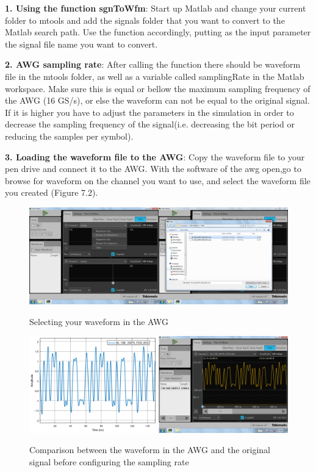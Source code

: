 \textbf{1. Using the function sgnToWfm}:
Start up Matlab and change your current folder to mtools and add the signals folder that you want to convert to the Matlab search path. Use the function accordingly, putting as the input parameter the signal file name you want to convert.
\bigskip

\noindent
\textbf{2. AWG sampling rate}:
After calling the function there should be waveform file in the mtools folder, as well as a variable called samplingRate in the Matlab workspace. Make sure this is equal or bellow the maximum sampling frequency of the AWG (16 GS/s), or else the waveform can not be equal to the original signal. If it is higher you  have to adjust the parameters in the simulation in order to decrease the sampling frequency of the signal(i.e. decreasing the bit period or reducing the samples per symbol).
\bigskip

\noindent
\textbf{3. Loading the waveform file to the AWG}:
Copy the waveform file to your pen drive and connect it to the AWG. With the software of the awg open,go to browse for waveform on the channel you want to use, and select the waveform file you created (Figure 7.2).

\begin{figure}[h]
	\centering
	\includegraphics[width=\textwidth]{../mtools/sgnToWfm/figures/tutorial1}
	\label{TUT_SelectingWFM}\caption{Selecting your waveform in the AWG}
\end{figure}
\begin{figure}[h]
	\centering
	\includegraphics[width=\textwidth]{../mtools/sgnToWfm/figures/tutorial2}
	\label{TUT_CompBad}\caption{Comparison between the waveform in the AWG and the original signal before configuring the sampling rate}
\end{figure}

